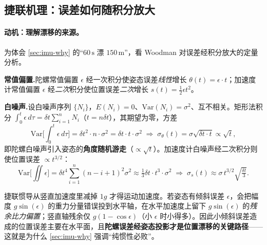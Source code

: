 \subsection{捷联机理：误差如何随积分放大}
\label{subsec:strapdown-error}

\paragraph{动机：理解漂移的来源。}
为体会 \cref{sec:imu-why} 的“$60\,\mathrm s$ 漂 $150\,\mathrm m$”，看 Woodman 对误差经积分放大的定量分析\cite{woodman2007inertial}。

\textbf{常值偏置.}\;陀螺常值偏置 $\epsilon$ 经一次积分使姿态误差\emph{线性}增长 $\theta(t)=\epsilon\cdot t$；加速度计常值偏置 $\epsilon$ 经\emph{二次}积分使位置误差\emph{二次}增长 $s(t)=\tfrac12\epsilon t^2$。

\textbf{白噪声.}\;设白噪声序列 $\{N_i\}$，$E(N_i)=0$、$\mathrm{Var}(N_i)=\sigma^2$、互不相关。矩形法积分 $\int_0^t\epsilon\,d\tau=\delta t\sum_{i=1}^nN_i$（$t=n\delta t$），其期望为零，方差
\[
  \mathrm{Var}\Big[\int_0^t\epsilon\,d\tau\Big]=\delta t^2\cdot n\cdot\sigma^2=\delta t\cdot t\cdot\sigma^2
  \;\Rightarrow\; \sigma_\theta(t)=\sigma\sqrt{\delta t\cdot t}\propto\sqrt t,
\]
即陀螺白噪声引入姿态的\textbf{角度随机游走}（$\propto\sqrt t$）。加速度计白噪声经二次积分则使位置误差 $\propto t^{3/2}$：
\[
  \mathrm{Var}\Big[\iint\epsilon\Big]=\delta t^4\sum_{i=1}^n(n-i+1)^2\sigma^2\approx\tfrac13\delta t\cdot t^3\cdot\sigma^2
  \;\Rightarrow\;\sigma_s(t)\approx\sigma\,t^{3/2}\sqrt{\tfrac{\delta t}{3}}.
\]

\begin{insight}\label{ins:gravity-tilt}
捷联惯导从竖直加速度里减掉 $1g$ 才得运动加速度。若姿态有倾斜误差 $\epsilon$，会把幅度 $g\sin(\epsilon)$ 的重力分量错误投到水平轴，在水平加速度上留下 $g\sin(\epsilon)$ 的\emph{残余比力偏置}；竖直轴残余仅 $g(1-\cos\epsilon)$（小 $\epsilon$ 时小得多）。因此小倾斜误差造成的位置误差主要在水平面，且\textbf{陀螺误差经姿态投影才是位置漂移的关键路径}——这就是为什么 \cref{sec:imu-why} 强调“纯惯性必败”。\cite{woodman2007inertial}
\end{insight}

